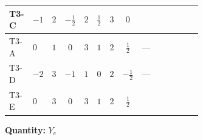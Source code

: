 \documentclass[8pt]{article}
\begin{document}
\begin{landscape}
\begin{longtable}{@{}llcccccc >{\raggedright\arraybackslash}p{0.21\linewidth} >{\raggedright\arraybackslash}p{0.21\linewidth} >{\raggedright\arraybackslash}p{0.21\linewidth}@{}}
T3-C & $-1$ & $2$ & $-\frac{1}{2}$ & $2$ & $\frac{1}{2}$ & $3$ & $0$ & \scriptsize\adjustbox{max width=\linewidth}{$\begin{gathered} +\frac{3}{4} (\left({y_1}\,\left({y_1}\right)^{\dagger}\,{Y_e}\right)_{ij}+\left({y_2}\,\left({y_2}\right)^{\dagger}\,{Y_e}\right)_{ij}+2 \left({Y_e}\,\left({Y_e}\right)^{\dagger}\,{Y_e}\right)_{ij})\end{gathered}$} & \scriptsize\adjustbox{max width=\linewidth}{$\begin{gathered} -\frac{9}{4} {g_2}^2 \left({Y_e}\right)_{ij}\end{gathered}$} & \scriptsize\adjustbox{max width=\linewidth}{$\begin{gathered} -\frac{15}{4} {g_1}^2 \left({Y_e}\right)_{ij}\end{gathered}$} \\
\midrule
T3-A & $0$ & $1$ & $0$ & $3$ & $1$ & $2$ & $\frac{1}{2}$ & --- & \scriptsize\adjustbox{max width=\linewidth}{$\begin{gathered} -\frac{9}{4} {g_2}^2 \left({Y_e}\right)_{ij}\end{gathered}$} & \scriptsize\adjustbox{max width=\linewidth}{$\begin{gathered} -\frac{15}{4} {g_1}^2 \left({Y_e}\right)_{ij}\end{gathered}$} \\
\midrule
T3-D & $-2$ & $3$ & $-1$ & $1$ & $0$ & $2$ & $-\frac{1}{2}$ & --- & \scriptsize\adjustbox{max width=\linewidth}{$\begin{gathered} -\frac{9}{4} {g_2}^2 \left({Y_e}\right)_{ij}\end{gathered}$} & \scriptsize\adjustbox{max width=\linewidth}{$\begin{gathered} -\frac{15}{4} {g_1}^2 \left({Y_e}\right)_{ij}\end{gathered}$} \\
\midrule
T3-E & $0$ & $3$ & $0$ & $3$ & $1$ & $2$ & $\frac{1}{2}$ & \scriptsize\adjustbox{max width=\linewidth}{$\begin{gathered} +\frac{3}{4} (\left({y_1}\,\left({y_1}\right)^{\dagger}\,{Y_e}\right)_{ij}+\left({y_2}\,\left({y_2}\right)^{\dagger}\,{Y_e}\right)_{ij}+2 \left({Y_e}\,\left({Y_e}\right)^{\dagger}\,{Y_e}\right)_{ij})\end{gathered}$} & \scriptsize\adjustbox{max width=\linewidth}{$\begin{gathered} -\frac{9}{4} {g_2}^2 \left({Y_e}\right)_{ij}\end{gathered}$} & \scriptsize\adjustbox{max width=\linewidth}{$\begin{gathered} -\frac{15}{4} {g_1}^2 \left({Y_e}\right)_{ij}\end{gathered}$} \\
\midrule
\bottomrule
\end{longtable}
\clearpage
\noindent\textbf{Quantity: }$Y_e$\par\smallskip

\end{landscape}
\end{document}
